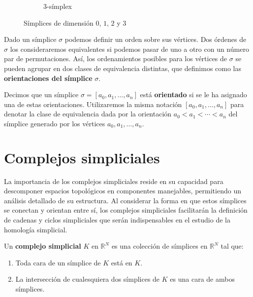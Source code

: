 \begin{figure}[h]
\begin{subfigure}{.24\textwidth}
		\caption{3-símplex}
	\end{subfigure}
	\caption{Símplices de dimensión $0$, $1$, $2$ y $3$}
	\label{fig:simplex}
\end{figure}

Dado un símplice $\sigma$ podemos definir un orden sobre sus vértices. Dos órdenes de $\sigma$ los consideraremos equivalentes si podemos pasar de uno a otro con un número par de permutaciones. Así, los ordenamientos posibles para los vértices de $\sigma$ se pueden agrupar en dos clases de equivalencia distintas, que definimos como las \textbf{orientaciones del símplice} $\sigma$.

\begin{definicion}
Decimos que un símplice $\sigma = [a_0, a_1, \ldots, a_n]$ está \textbf{orientado} si se le ha asignado una de estas orientaciones. Utilizaremos la misma notación $[a_0, a_1, \ldots, a_n]$ para denotar la clase de equivalencia dada por la orientación $a_0 < a_1 < \cdots < a_n$ del símplice generado por los vértices $a_0,a_1,\ldots, a_n$.
\end{definicion}

\section{Complejos simpliciales}

La importancia de los complejos simpliciales reside en su capacidad para descomponer espacios topológicos en componentes manejables, permitiendo un análisis detallado de su estructura. Al considerar la forma en que estos símplices se conectan y orientan entre sí, los complejos simpliciales facilitarán la definición de cadenas y ciclos simpliciales que serán indispensables en el estudio de la homología simplicial.

\begin{definicion}
	Un \textbf{complejo simplicial} $K$ en $\mathbb{R}^N$ es una colección de símplices en $\mathbb{R}^N$
	 tal que:
	\begin{enumerate}
		\item Toda cara de un símplice de $K$ está en $K$.
		\item La intersección de cualesquiera dos símplices de $K$ es una cara 
		de ambos símplices.
	\end{enumerate}
\end{definicion}

